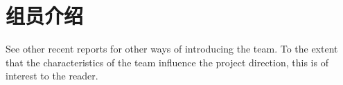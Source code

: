 
\section{组员介绍}
\label{sec:team}

\begin{remark} \color{blue}
See other recent reports for other ways of introducing the team. To the extent that the characteristics of the team influence the project direction, this is of interest to the reader.
\end{remark} \normalcolor





